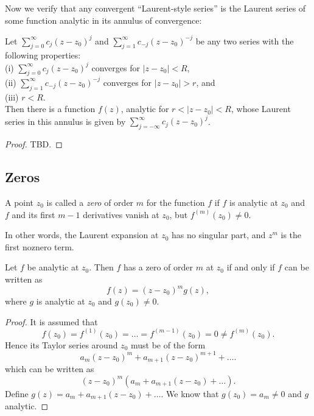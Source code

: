 Now we verify that any convergent ``Laurent-style series'' is the Laurent series of some function analytic in its annulus of convergence:
\begin{theorem}
	Let $\sum_{j=0}^{\infty} c_j\left(z-z_0\right)^j$ and $\sum_{j=1}^{\infty} c_{-j}\left(z-z_0\right)^{-j}$ be any two series with the following properties:\\
(i) $\sum_{j=0}^{\infty} c_j\left(z-z_0\right)^j$ converges for $\left|z-z_0\right|<R$,\\
(ii) $\sum_{j=1}^{\infty} c_{-j}\left(z-z_0\right)^{-j}$ converges for $\left|z-z_0\right|>r$, and\\
(iii) $r<R$.\\
Then there is a function $f(z)$, analytic for $r<\left|z-z_0\right|<R$, whose Laurent series in this annulus is given by $\sum_{j=-\infty}^{\infty} c_j\left(z-z_0\right)^j$.
\end{theorem}
\begin{proof}
	TBD.
\end{proof}

\subsection{Zeros}

\begin{definition}[Zero]
	A point $z_0$ is called a \textit{zero} of order $m$ for the function $f$ if $f$ is analytic at $z_0$ and $f$ and its first $m-1$ derivatives vanish at $z_0$, but $f^{(m)}\left(z_0\right) \neq 0$.

	In other words, the Laurent expansion at $z_0$ has no singular part, and $z^m$ is the first noznero term.
\end{definition}

\begin{theorem}
Let $f$ be analytic at $z_0$. Then $f$ has a zero of order $m$ at $z_0$ if and only if $f$ can be written as
\[
f(z)=\left(z-z_0\right)^m g(z),
\]
where $g$ is analytic at $z_0$ and $g\left(z_0\right) \neq 0$.	
\end{theorem}
\begin{proof}
	It is assumed that
	\[
		f(z_0) = f^{(1)}(z_0) = \ldots = f^{(m-1)}(z_0) = 0 \neq  f^{(m)}(z_0)
	.\] 
	Hence its Taylor series around $z_0$ must be of the form
	\[
		a_m (z-z_0)^m + a_{m+1}(z-z_0)^{m+1} + \ldots
	.\] 
	which can be written as
	\[
		(z-z_0)^m \left( a_m + a_{m+1}(z-z_0) + \ldots \right) 
	.\] 
	Define $g(z) =  a_m + a_{m+1}(z-z_0) + \ldots $. We know that $g(z_0) = a_m \neq 0$ and $g$ analytic. 
\end{proof}


